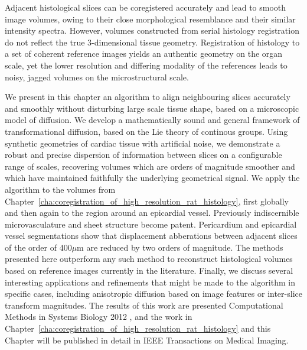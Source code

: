 Adjacent histological slices can be coregistered accurately and lead to smooth image volumes, owing to their close morphological resemblance and their similar intensity spectra. However, volumes constructed from serial histology registration do not reflect the true 3-dimensional tissue geometry. Registration of histology to a set of coherent reference images yields an authentic geometry on the organ scale, yet the lower resolution and differing modality of the references leads to noisy, jagged volumes on the microstructural scale.

We present in this chapter an algorithm to align neighbouring slices accurately and smoothly without disturbing large scale tissue shape, based on a microscopic model of diffusion. We develop a mathematically sound and general framework of transformational diffusion, based on the Lie theory of continous groups. Using synthetic geometries of cardiac tissue with artificial noise, we demonstrate a robust and precise dispersion of information between slices on a configurable range of scales, recovering volumes which are orders of magnitude smoother and which have maintained faithfully the underlying geometrical signal. We apply the algorithm to the volumes from Chapter~\ref{cha:coregistration_of_high_resolution_rat_histology}, first globally and then again to the region around an epicardial vessel. Previously indiscernible microvasculature and sheet structure become patent. Pericardium and epicardial vessel segmentations show that displacement abberations between adjacent slices of the order of 400$\mu$m are reduced by two orders of magnitude. The methods presented here outperform any such method to reconstruct histological volumes based on reference images currently in the literature. Finally, we discuss several interesting applications and refinements that might be made to the algorithm in specific cases, including anisotropic diffusion based on image features or inter-slice transform magnitudes. The results of this work are presented Computational Methods in Systems Biology 2012 \cite{Gibb2012}, and the work in Chapter~\ref{cha:coregistration_of_high_resolution_rat_histology} and this Chapter will be published in detail in IEEE Transactions on Medical Imaging.
